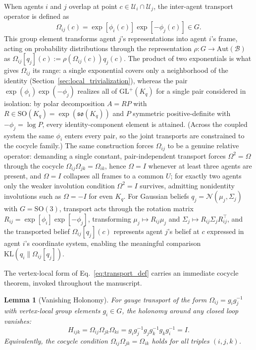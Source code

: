 \documentclass[11pt]{article}
\newtheorem{lemma}{Lemma}
\begin{document}
When agents $i$ and $j$ overlap at point $c \in \mathcal{U}_i \cap \mathcal{U}_j$, the inter-agent transport operator is defined as
\begin{equation}
\Omega_{ij}(c) = \exp[\phi_i(c)] \exp[-\phi_j(c)] \in G.
\label{eq:transport_def}
\end{equation}
This group element transforms agent $j$'s representations into agent $i$'s frame, acting on probability distributions through the representation $\rho: G \to \mathrm{Aut}(\mathcal{B})$ as $\Omega_{ij}[q_j](c) := \rho(\Omega_{ij}(c)) q_j(c)$. The product of two exponentials is what gives $\Omega_{ij}$ its range: a single exponential covers only a neighborhood of the identity (Section~\ref{sec:local_trivialization}), whereas the pair $\exp(\phi_i)\exp(-\phi_j)$ realizes all of $\mathrm{GL}^+(K_q)$ for a single pair considered in isolation: by polar decomposition $A = RP$ with $R \in \mathrm{SO}(K_q) = \exp(\mathfrak{so}(K_q))$ and $P$ symmetric positive-definite with $-\phi_j = \log P$, every identity-component element is attained. (Across the coupled system the same $\phi_i$ enters every pair, so the joint transports are constrained to the cocycle family.) The same construction forces $\Omega_{ij}$ to be a genuine relative operator: demanding a single constant, pair-independent transport forces $\Omega^2 = \Omega$ through the cocycle $\Omega_{ij}\Omega_{jk} = \Omega_{ik}$, hence $\Omega = I$ whenever at least three agents are present, and $\Omega = I$ collapses all frames to a common $U$; for exactly two agents only the weaker involution condition $\Omega^2 = I$ survives, admitting nonidentity involutions such as $\Omega = -I$ for even $K_q$. For Gaussian beliefs $q_j = \mathcal{N}(\mu_j, \Sigma_j)$ with $G = \mathrm{SO}(3)$, transport acts through the rotation matrix $R_{ij} = \exp[\phi_i]\exp[-\phi_j]$, transforming $\mu_j \mapsto R_{ij}\mu_j$ and $\Sigma_j \mapsto R_{ij}\Sigma_j R_{ij}^\top$, and the transported belief $\Omega_{ij}[q_j](c)$ represents agent $j$'s belief at $c$ expressed in agent $i$'s coordinate system, enabling the meaningful comparison $\mathrm{KL}(q_i \| \Omega_{ij}[q_j])$.

The vertex-local form of Eq.~\eqref{eq:transport_def} carries an immediate cocycle theorem, invoked throughout the manuscript.

\begin{lemma}[Vanishing Holonomy]
\label{thm:vanishing_holonomy}
For gauge transport of the form $\Omega_{ij} = g_ig_j^{-1}$ with vertex-local group elements $g_i \in G$, the holonomy around any closed loop vanishes:
\begin{equation}
H_{ijk} = \Omega_{ij}\Omega_{jk}\Omega_{ki}
= g_ig_j^{-1}g_jg_k^{-1}g_kg_i^{-1}
= I.
\label{eq:holonomy}
\end{equation}
Equivalently, the cocycle condition $\Omega_{ij}\Omega_{jk} = \Omega_{ik}$ holds for all triples $(i,j,k)$.
\end{lemma}
\end{document}

